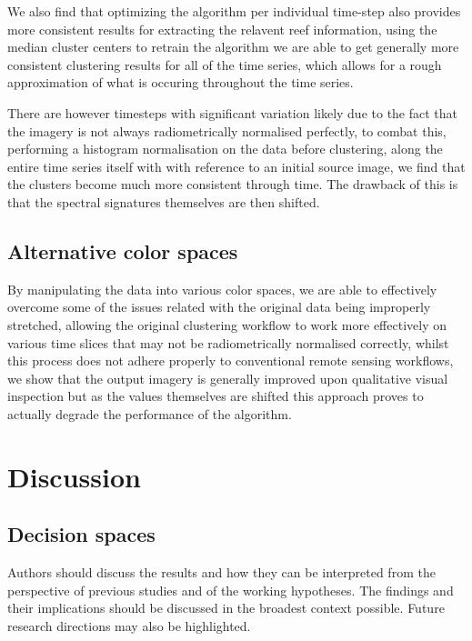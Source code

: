 \documentclass[journal,article,submit,pdftex,moreauthors]{Definitions/mdpi}
\begin{document}
We also find that optimizing the algorithm per individual time-step also provides more consistent results for extracting the relavent reef information, using the median cluster centers to retrain the algorithm we are 
able to get generally more consistent clustering results for all of the time series, which allows for a rough approximation of what is occuring throughout the time series.


There are however timesteps with significant variation likely due to the fact that the imagery is not always radiometrically normalised perfectly, to combat this, performing a histogram normalisation on the data before clustering, 
along the entire time series itself with with reference to an initial source image, we find that the clusters become much more consistent through time. The drawback of this is that the spectral signatures themselves are then shifted.   



\subsection*{Alternative color spaces}
By manipulating the data into various color spaces, we are able to effectively overcome some of the issues related with the original data being improperly stretched, allowing the original clustering workflow to work more effectively on various 
time slices that may not be radiometrically
normalised correctly, whilst this process does not adhere properly to conventional remote sensing workflows, we show that the output imagery is generally improved upon qualitative visual inspection but as the values
themselves are shifted this approach proves to actually degrade the performance of the algorithm. 

\section{Discussion}

\subsection*{Decision spaces}


Authors should discuss the results and how they can be interpreted from the perspective of previous studies and of the working hypotheses. The findings and their implications should be discussed in the broadest context possible. Future research directions may also be highlighted.
\end{document}
